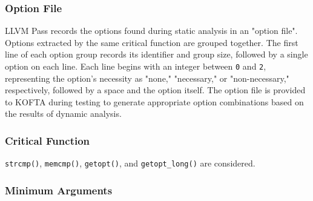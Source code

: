 \subsubsection{Option File} %

LLVM Pass records the options found during static analysis in an "option file". Options extracted by the same critical function are grouped together. The first line of each option group records its identifier and group size, followed by a single option on each line. Each line begins with an integer between \texttt{0} and \texttt{2}, representing the option's necessity as "none," "necessary," or "non-necessary," respectively, followed by a space and the option itself. The option file is provided to KOFTA during testing to generate appropriate option combinations based on the results of dynamic analysis.

\subsubsection{Critical Function} %
\label{subsec:optana-key-funcs}

\texttt{strcmp()}, \texttt{memcmp()}, \texttt{getopt()}, and \texttt{getopt\_long()} are considered.

\subsubsection{Minimum Arguments} %

